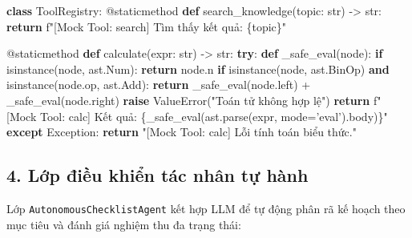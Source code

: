 \documentclass[]{article}
\newenvironment{Shaded}{}{}
\newcommand{\AttributeTok}[1]{\textcolor[rgb]{0.49,0.56,0.16}{#1}}
\newcommand{\BuiltInTok}[1]{#1}
\newcommand{\ControlFlowTok}[1]{\textcolor[rgb]{0.00,0.44,0.13}{\textbf{#1}}}
\newcommand{\DataTypeTok}[1]{\textcolor[rgb]{0.56,0.13,0.00}{#1}}
\newcommand{\FunctionTok}[1]{\textcolor[rgb]{0.02,0.16,0.49}{#1}}
\newcommand{\KeywordTok}[1]{\textcolor[rgb]{0.00,0.44,0.13}{\textbf{#1}}}
\newcommand{\NormalTok}[1]{#1}
\newcommand{\OperatorTok}[1]{\textcolor[rgb]{0.40,0.40,0.40}{#1}}
\newcommand{\PreprocessorTok}[1]{\textcolor[rgb]{0.74,0.48,0.00}{#1}}
\newcommand{\StringTok}[1]{\textcolor[rgb]{0.25,0.44,0.63}{#1}}
\begin{document}
\begin{Shaded}
\begin{Highlighting}[]
\KeywordTok{class}\NormalTok{ }\DataTypeTok{ToolRegistry}\NormalTok{:}
    \AttributeTok{@staticmethod}
    \KeywordTok{def}\NormalTok{ }\FunctionTok{search_knowledge}\NormalTok{(topic: }\DataTypeTok{str}\NormalTok{) }\OperatorTok{->} \DataTypeTok{str}\NormalTok{:}
        \ControlFlowTok{return} \StringTok{f"[Mock Tool: search] Tìm thấy kết quả: \{topic\}"}

    \AttributeTok{@staticmethod}
    \KeywordTok{def}\NormalTok{ }\FunctionTok{calculate}\NormalTok{(expr: }\DataTypeTok{str}\NormalTok{) }\OperatorTok{->} \DataTypeTok{str}\NormalTok{:}
        \ControlFlowTok{try}\NormalTok{:}
            \KeywordTok{def}\NormalTok{ }\FunctionTok{_safe_eval}\NormalTok{(node):}
                \ControlFlowTok{if} \BuiltInTok{isinstance}\NormalTok{(node, ast.Num): }\ControlFlowTok{return}\NormalTok{ node.n}
                \ControlFlowTok{if} \BuiltInTok{isinstance}\NormalTok{(node, ast.BinOp) }\KeywordTok{and} \BuiltInTok{isinstance}\NormalTok{(node.op, ast.Add):}
                    \ControlFlowTok{return}\NormalTok{ _safe_eval(node.left) }\OperatorTok{+}\NormalTok{ _safe_eval(node.right)}
                \ControlFlowTok{raise} \PreprocessorTok{ValueError}\NormalTok{(}\StringTok{"Toán tử không hợp lệ"}\NormalTok{)}
            \ControlFlowTok{return} \StringTok{f"[Mock Tool: calc] Kết quả: \{_safe_eval(ast.parse(expr, mode='eval').body)\}"}
        \ControlFlowTok{except} \PreprocessorTok{Exception}\NormalTok{:}
            \ControlFlowTok{return} \StringTok{"[Mock Tool: calc] Lỗi tính toán biểu thức."}
\end{Highlighting}
\end{Shaded}

\subsection{4. Lớp điều khiển tác nhân tự hành}
Lớp \texttt{AutonomousChecklistAgent} kết hợp LLM để tự động phân rã kế hoạch theo mục tiêu và đánh giá nghiệm thu đa trạng thái:
\end{document}
